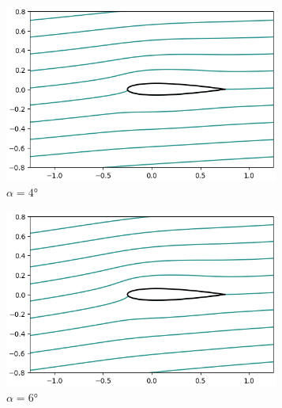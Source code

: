 \documentclass[letterpaper, openright, 12pt]{book}
\begin{document}
    \begin{figure}[htbp!]
        \centering
        \begin{subfigure}[c]{0.48\textwidth}
            \includegraphics[keepaspectratio, width=0.99\textwidth]
                {./img/potential_flow_stream_4}
            \caption{$\alpha = 4\si{\degree}$}
            \label{fig:potential_flow_stream_4}
        \end{subfigure}
        \hfill
        \begin{subfigure}[c]{0.48\textwidth}
            \includegraphics[keepaspectratio, width=0.99\textwidth]
                {./img/potential_flow_stream_6}
            \caption{$\alpha = 6\si{\degree}$}
            \label{fig:potential_flow_stream_6}
        \end{subfigure}
        \begin{subfigure}[c]{0.48\textwidth}

\end{subfigure}
\end{figure}
\end{document}
